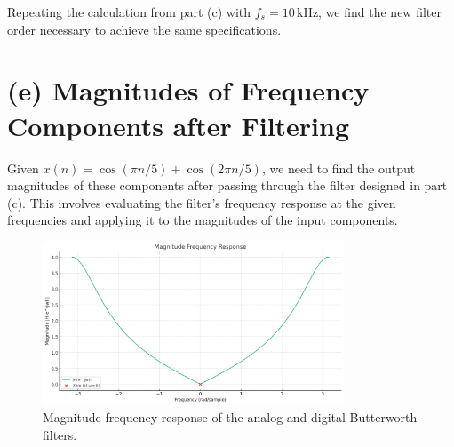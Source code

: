 \documentclass{article}
\begin{document}
Repeating the calculation from part (c) with $f_s = 10 \, \text{kHz}$, we find the new filter order necessary to achieve the same specifications.

\section*{(e) Magnitudes of Frequency Components after Filtering}

Given $x(n) = \cos(\pi n / 5) + \cos(2\pi n / 5)$, we need to find the output magnitudes of these components after passing through the filter designed in part (c). This involves evaluating the filter's frequency response at the given frequencies and applying it to the magnitudes of the input components.

\begin{figure}[H]
    \centering
    \includegraphics[width=0.8\textwidth]{frequency_response.png}
    \caption{Magnitude frequency response of the analog and digital Butterworth filters.}
\end{figure}
\end{document}
